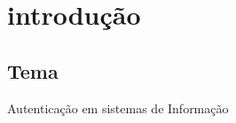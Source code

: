 \chapter{introdução}\label{ch:introducao}


\section{Tema}\label{sec:tema}
Autenticação em sistemas de Informação



